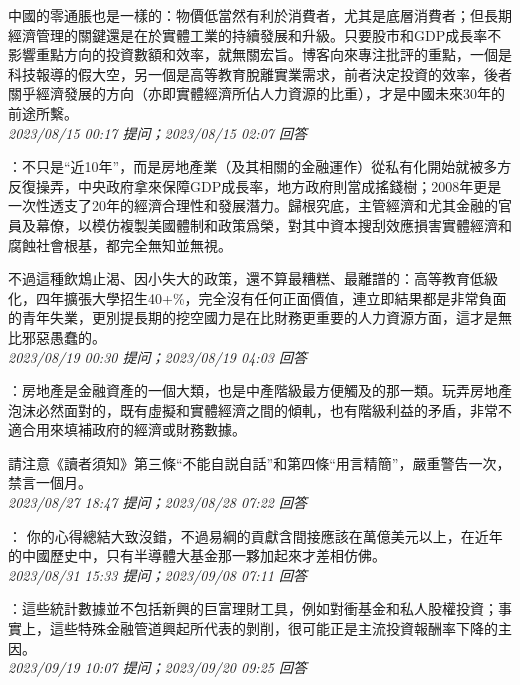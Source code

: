 \documentclass[twocolumn]{ctexart}
\begin{document}
中國的零通脹也是一樣的：物價低當然有利於消費者，尤其是底層消費者；但長期經濟管理的關鍵還是在於實體工業的持續發展和升級。只要股市和GDP成長率不影響重點方向的投資數額和效率，就無關宏旨。博客向來專注批評的重點，一個是科技報導的假大空，另一個是高等教育脫離實業需求，前者決定投資的效率，後者關乎經濟發展的方向（亦即實體經濟所佔人力資源的比重），才是中國未來30年的前途所繫。
\\

\textit{\hfill\noindent\small 2023/08/15 00:17 提问；2023/08/15 02:07 回答}

：不只是“近10年”，而是房地產業（及其相關的金融運作）從私有化開始就被多方反復操弄，中央政府拿來保障GDP成長率，地方政府則當成搖錢樹；2008年更是一次性透支了20年的經濟合理性和發展潛力。歸根究底，主管經濟和尤其金融的官員及幕僚，以模仿複製美國體制和政策爲榮，對其中資本搜刮效應損害實體經濟和腐蝕社會根基，都完全無知並無視。

不過這種飲鴆止渴、因小失大的政策，還不算最糟糕、最離譜的：高等教育低級化，四年擴張大學招生40+\%，完全沒有任何正面價值，連立即結果都是非常負面的青年失業，更別提長期的挖空國力是在比財務更重要的人力資源方面，這才是無比邪惡愚蠢的。
\\

\textit{\hfill\noindent\small 2023/08/19 00:30 提问；2023/08/19 04:03 回答}

：房地產是金融資產的一個大類，也是中產階級最方便觸及的那一類。玩弄房地產泡沫必然面對的，既有虛擬和實體經濟之間的傾軋，也有階級利益的矛盾，非常不適合用來填補政府的經濟或財務數據。

請注意《讀者須知》第三條“不能自説自話”和第四條“用言精簡”，嚴重警告一次，禁言一個月。
\\

\textit{\hfill\noindent\small 2023/08/27 18:47 提问；2023/08/28 07:22 回答}

：
你的心得總結大致沒錯，不過易綱的貢獻含間接應該在萬億美元以上，在近年的中國歷史中，只有半導體大基金那一夥加起來才差相仿佛。
\\

\textit{\hfill\noindent\small 2023/08/31 15:33 提问；2023/09/08 07:11 回答}

：這些統計數據並不包括新興的巨富理財工具，例如對衝基金和私人股權投資；事實上，這些特殊金融管道興起所代表的剝削，很可能正是主流投資報酬率下降的主因。
\\

\textit{\hfill\noindent\small 2023/09/19 10:07 提问；2023/09/20 09:25 回答}
\end{document}
